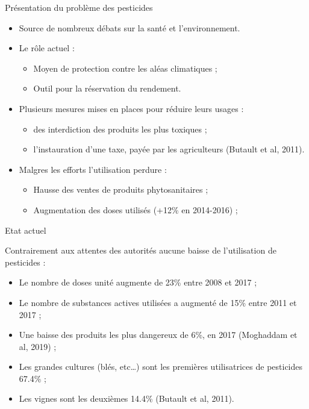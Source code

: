 \documentclass[11pt,ignorenonframetext,]{beamer}
\providecommand{\tightlist}{%
  \setlength{\itemsep}{0pt}\setlength{\parskip}{0pt}}
\begin{document}
\begin{frame}{Présentation du problème des pesticides}
\protect\hypertarget{presentation-du-probleme-des-pesticides}{}

\begin{itemize}
\tightlist
\item
  Source de nombreux débats sur la santé et l'environnement.
\item
  Le rôle actuel :

  \begin{itemize}
  \tightlist
  \item
    Moyen de protection contre les aléas climatiques ;
  \item
    Outil pour la réservation du rendement.
  \end{itemize}
\item
  Plusieurs mesures mises en places pour réduire leurs usages :

  \begin{itemize}
  \tightlist
  \item
    des interdiction des produits les plus toxiques ;
  \item
    l'instauration d'une taxe, payée par les agriculteurs (Butault et
    al, 2011).
  \end{itemize}
\item
  Malgres les efforts l'utilisation perdure :

  \begin{itemize}
  \tightlist
  \item
    Hausse des ventes de produits phytosanitaires ;
  \item
    Augmentation des doses utilisés (+12\% en 2014-2016) ;
  \end{itemize}
\end{itemize}

\end{frame}

\begin{frame}{Etat actuel}
\protect\hypertarget{etat-actuel}{}

Contrairement aux attentes des autorités aucune baisse de l'utilisation
de pesticides :

\begin{itemize}
\tightlist
\item
  Le nombre de doses unité augmente de 23\% entre 2008 et 2017 ;
\item
  Le nombre de substances actives utilisées a augmenté de 15\% entre
  2011 et 2017 ;
\item
  Une baisse des produits les plus dangereux de 6\%, en 2017 (Moghaddam
  et al, 2019) ;
\item
  Les grandes cultures (blés, etc\ldots{}) sont les premières
  utilisatrices de pesticides 67.4\% ;
\item
  Les vignes sont les deuxièmes 14.4\% (Butault et al, 2011).
\end{itemize}

\end{frame}
\end{document}
